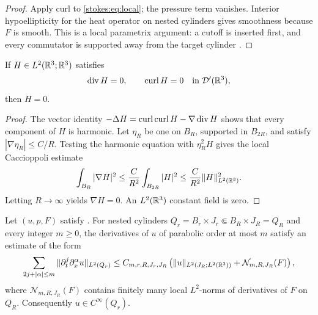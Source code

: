 \begin{proof}
Apply curl to \eqref{stokes:eq:local}; the pressure term vanishes.  Interior
hypoellipticity for the heat operator on nested cylinders gives smoothness
because \(F\) is smooth.  This is a local parametrix argument: a cutoff is
inserted first, and every commutator is supported away from the target
cylinder \cite[Chapter~IV]{LadyzhenskayaSolonnikovUraltseva1968}.
\end{proof}

\begin{lemma}
\label{stokes:lem:finite-energy-kernel}
If \(H\in L^2(\mathbb R^3;\mathbb R^3)\) satisfies
\[
 \operatorname{div} H=0,
 \qquad \operatorname{curl} H=0
 \quad\hbox{in }\mathcal D'(\mathbb R^3),
\]
then \(H=0\).
\end{lemma}

\begin{proof}
The vector identity
\(-\Delta H=\operatorname{curl}\operatorname{curl} H-\nabla\operatorname{div} H\) shows that every component of
\(H\) is harmonic.  Let \(\eta_R\) be one on \(B_R\), supported in
\(B_{2R}\), and satisfy \(|\nabla\eta_R|\le C/R\).  Testing the harmonic
equation with \(\eta_R^2H\) gives the local Caccioppoli estimate
\[
 \int_{B_R}|\nabla H|^2
 \le \frac{C}{R^2}\int_{B_{2R}}|H|^2
 \le \frac{C}{R^2}\|H\|_{L^2(\mathbb R^3)}^2.
\]
Letting \(R\to\infty\) yields \(\nabla H=0\).  An \(L^2(\mathbb R^3)\) constant
field is zero.
\end{proof}

\begin{lemma}
\label{stokes:lem:local-bootstrap}
Let \((u,p,F)\) satisfy .  For nested cylinders
\(Q_r=B_r\times J_r\Subset B_R\times J_R=Q_R\) and every integer \(m\ge0\),
the derivatives of \(u\) of parabolic order at most \(m\) satisfy an estimate
of the form
\begin{equation}\label{stokes:eq:local-bootstrap}
 \sum_{2j+|\alpha|\le m}
 \|\partial_t^j\partial_x^\alpha u\|_{L^2(Q_r)}
 \le C_{m,r,R,J_r,J_R}
 \left(
   \|u\|_{L^2(J_R;L^2(\mathbb R^3))}
   +\mathcal N_{m,R,J_R}(F)
 \right),
\end{equation}
where \(\mathcal N_{m,R,J_R}(F)\) contains finitely many local \(L^2\)-norms
of derivatives of \(F\) on \(Q_R\).  Consequently
\(u\in C^\infty(Q_r)\).

\end{lemma}

